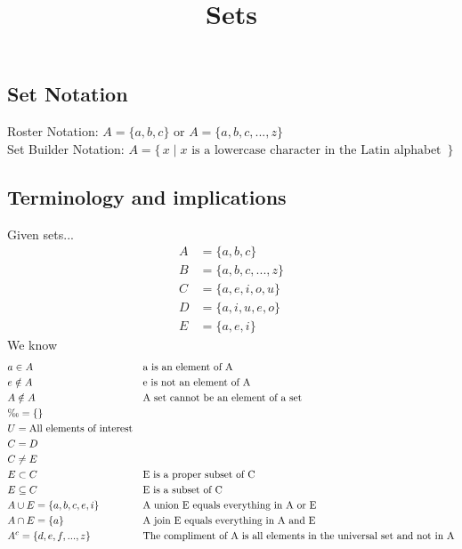 \documentclass[]{article}
\title{\vspace{-5ex}Sets \vspace{-5ex}}
\author{}
\date{}
\begin{document}
	\maketitle{}
	
	\subsection*{}
	
	\subsection*{Set Notation}
	Roster Notation: $ A = \{ a, b, c \} $ or $ A = \{ a, b, c, ..., z \} $ \\
	Set Builder Notation: $ A = \{\,x \mid x \text{ is a lowercase character in the Latin alphabet }\,\}$
	
	\subsection*{Terminology and implications}
	Given sets...
	\begin{align*}
		A &= \{ a, b, c \} \\
		B &= \{ a, b, c, ..., z \} \\
		C &= \{ a, e, i, o, u \} \\
		D &= \{ a, i, u, e, o \} \\
		E &= \{ a, e, i \}
	\end{align*}
	We know
	\begin{align*}
		& a \in A              & &\text{a is an element of A} \\
		& e \notin A        & &\text{e is not an element of A} \\
		& A \notin A        & &\text{A set cannot be an element of a set} \\
		& \O = \{ \}           & & \\
		& U = \text{All elements of interest} & & \\
		& C = D               && \\
		& C \neq E          & & \\
		& E \subset C     & &\text{E is a proper subset of C} \\
		& E \subseteq C & &\text{E is a subset of C} \\
		& A \cup E = \{ a, b, c, e, i \} & &\text{A union E equals everything in A or E} \\
		& A \cap E = \{ a \} & &\text{A join E equals everything in A and E} \\
		& A^c = \{ d, e, f, ..., z \} & &\text{The compliment of A is all elements in the universal set and not in A}
	\end{align*}
	
\end{document}
